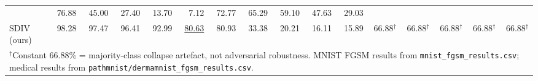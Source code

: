 \begin{table}[t]
\begin{tabular}{@{}l rrrrr | rrrrr | rrrrr@{}}
  & 76.88 & 45.00 & 27.40 & 13.70 &  7.12
  & 72.77 & 65.29 & 59.10 & 47.63 & 29.03 \\
SDIV (ours)
  & 98.28 & 97.47 & 96.41 & 92.99 & \underline{80.63}
  & 80.93 & 33.38 & 20.21 & 16.11 & 15.89
  & 66.88$^\dagger$ & 66.88$^\dagger$ & 66.88$^\dagger$ & 66.88$^\dagger$ & 66.88$^\dagger$ \\
\midrule
\multicolumn{16}{l}{%
  \footnotesize
  $^\dagger$Constant 66.88\% = majority-class collapse artefact, not adversarial robustness.
  MNIST FGSM results from \texttt{mnist\_fgsm\_results.csv};
  medical results from \texttt{pathmnist/dermamnist\_fgsm\_results.csv}.
} \\
\bottomrule
\end{tabular}
\end{table}
